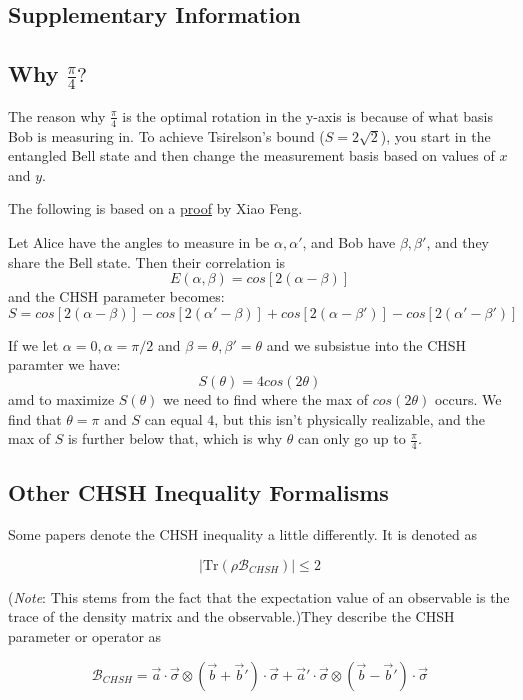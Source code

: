 \documentclass[a4paper, onecolumn, 11pt, titlepage]{quantumarticle}
\begin{document}
\begin{appendices}
\section{Supplementary Information}\label{firstappendix}

\subsection{Why $\frac{\pi}{4}?$}

The reason why $\frac{\pi}{4}$ is the optimal rotation in the y-axis is because of what basis Bob is measuring in. To achieve Tsirelson's bound ($S = 2\sqrt2$), you start in the entangled Bell state and then change the measurement basis based on values of $x$ and $y$. 

The following is based on a \href{ttps://math.ucsd.edu/sites/math.ucsd.edu/files/XiaoFeng.pdf}{proof} by Xiao Feng.

Let Alice have the angles to measure in be $\alpha, \alpha'$, and Bob have $\beta, \beta'$, and they share the Bell state. Then their correlation is
$$E(\alpha, \beta) = cos[2(\alpha -\beta)]$$
and the CHSH parameter becomes:
$$S = cos[2(\alpha -\beta)] - cos[2(\alpha' -\beta)] + cos[2(\alpha -\beta')] - cos[2(\alpha' -\beta')]$$

If we let $\alpha = 0, \alpha = \pi/2$ and $\beta = \theta, \beta' = \theta$ and we subsistue into the CHSH paramter we have:
$$S(\theta) = 4cos(2\theta)$$ 
amd to maximize $S(\theta)$ we need to find where the max of $cos(2\theta)$ occurs. We find that $\theta = \pi$ and $S$ can equal $4$, but this isn't physically realizable, and the max of $S$ is further below that, which is why $\theta$ can only go up to $\frac{\pi}{4}$.

\subsection{Other CHSH Inequality Formalisms}
Some papers denote the CHSH inequality a little differently. It is denoted as 

$$\left|\text{Tr}\left(\rho \mathcal{B}_{CHSH}\right) \right| \leq 2$$

(\textit{Note}: This stems from the fact that the expectation value of an observable is the trace of the density matrix and the observable.)They describe the CHSH parameter or operator as 

$$\mathcal{B}_{CHSH} = \vec{a} \cdot \vec{\sigma} \otimes \left(\vec{b} +\vec{b}' \right) \cdot \vec{\sigma} + \vec{a}' \cdot \vec{\sigma} \otimes \left(\vec{b} - \vec{b}'\right) \cdot \vec{\sigma}$$


\end{appendices}
\end{document}
